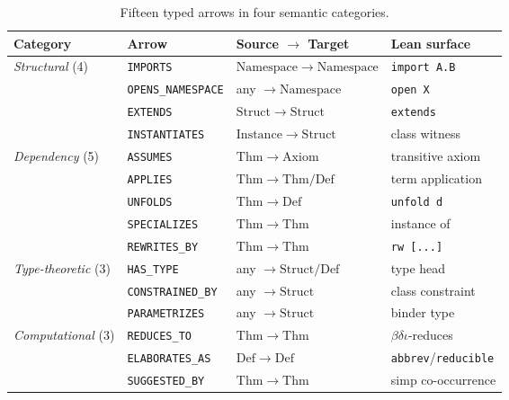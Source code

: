 \documentclass[11pt]{article}
\begin{document}
\begin{table}[h]
\centering
\small
\begin{tabular}{llll}
\toprule
Category & Arrow & Source $\to$ Target & Lean surface \\
\midrule
\textit{Structural} (4)
 & \lstinline|IMPORTS|          & $\mathrm{Namespace}\to\mathrm{Namespace}$ & \lstinline|import A.B| \\
 & \lstinline|OPENS_NAMESPACE|  & any $\to\mathrm{Namespace}$               & \lstinline|open X| \\
 & \lstinline|EXTENDS|          & $\mathrm{Struct}\to\mathrm{Struct}$       & \lstinline|extends| \\
 & \lstinline|INSTANTIATES|     & $\mathrm{Instance}\to\mathrm{Struct}$     & class witness \\
\midrule
\textit{Dependency} (5)
 & \lstinline|ASSUMES|          & $\mathrm{Thm}\to\mathrm{Axiom}$           & transitive axiom \\
 & \lstinline|APPLIES|          & $\mathrm{Thm}\to\mathrm{Thm}/\mathrm{Def}$ & term application \\
 & \lstinline|UNFOLDS|          & $\mathrm{Thm}\to\mathrm{Def}$             & \lstinline|unfold d| \\
 & \lstinline|SPECIALIZES|      & $\mathrm{Thm}\to\mathrm{Thm}$             & instance of \\
 & \lstinline|REWRITES_BY|      & $\mathrm{Thm}\to\mathrm{Thm}$             & \lstinline|rw [...]| \\
\midrule
\textit{Type-theoretic} (3)
 & \lstinline|HAS_TYPE|         & any $\to\mathrm{Struct}/\mathrm{Def}$     & type head \\
 & \lstinline|CONSTRAINED_BY|   & any $\to\mathrm{Struct}$                  & class constraint \\
 & \lstinline|PARAMETRIZES|     & any $\to\mathrm{Struct}$                  & binder type \\
\midrule
\textit{Computational} (3)
 & \lstinline|REDUCES_TO|       & $\mathrm{Thm}\to\mathrm{Thm}$             & $\beta\delta\iota$-reduces \\
 & \lstinline|ELABORATES_AS|    & $\mathrm{Def}\to\mathrm{Def}$             & \lstinline|abbrev|/\lstinline|reducible| \\
 & \lstinline|SUGGESTED_BY|     & $\mathrm{Thm}\to\mathrm{Thm}$             & simp co-occurrence \\
\bottomrule
\end{tabular}
\caption{Fifteen typed arrows in four semantic categories.}
\label{tab:arrows}
\end{table}
\end{document}
